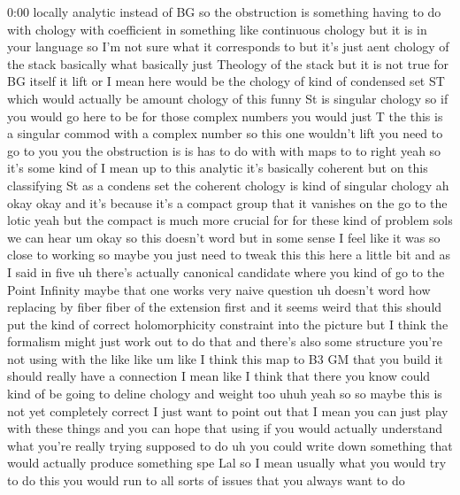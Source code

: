 \begin{unfinished}{0:00}
locally  analytic  instead  of  BG  so  the
obstruction  is  something  having  to  do
with  chology  with  coefficient  in
something  like  continuous  chology  but  it
is  in  your  language  so  I'm  not  sure  what
it  corresponds  to  but  it's  just  aent
chology  of  the  stack  basically  what
basically  just  Theology  of  the
stack  but  it  is  not  true  for  BG  itself
it  lift  or  I  mean  here  would  be  the
chology  of  kind  of  condensed  set  ST
which  would  actually  be  amount  chology
of  this  funny  St  is  singular
chology  so  if  you  would  go  here  to  be
for  those  complex  numbers  you  would  just
T  the  this  is  a  singular  commod  with  a
complex  number  so  this  one  wouldn't  lift
you  need  to  go
to  you  you  the  obstruction  is  is  has  to
do  with  with  maps
to
to  right  yeah  so  it's  some  kind  of  I
mean  up  to  this  analytic  it's  basically
coherent  but  on  this  classifying  St  as  a
condens  set  the  coherent  chology  is  kind
of  singular  chology  ah  okay  okay
and  it's  because  it's  a  compact  group
that  it  vanishes  on
the  go  to  the  lotic  yeah  but  the  compact
is  much  more  crucial  for  for  these  kind
of  problem  sols  we  can  hear
um  okay  so  this  doesn't  word  but  in  some
sense  I  feel  like  it  was  so  close  to
working  so  maybe  you  just  need  to  tweak
this  this  here  a  little  bit  and  as  I
said  in  five  uh  there's  actually
canonical  candidate  where  you  kind  of  go
to  the  Point  Infinity  maybe  that  one
works  very  naive
question
uh  doesn't
word  how
replacing
by
fiber  fiber  of  the
extension  first
and  it  seems  weird  that  this  should  put
the  kind  of  correct  holomorphicity
constraint  into  the  picture  but  I  think
the  formalism  might  just  work  out  to  do
that  and  there's  also  some  structure
you're  not  using  with  the  like
like
um  like  I  think  this  map  to  B3  GM  that
you
build  it  should  really  have  a  connection
I  mean  like  I  think  that  there  you  know
could  kind  of  be  going  to  deline  chology
and  weight  too
uhuh  yeah  so  so  maybe  this  is  not  yet
completely  correct  I  just  want  to  point
out  that  I  mean  you  can  just  play  with
these  things  and  you  can  hope  that  using
if  you  would  actually  understand  what
you're  really  trying  supposed  to  do  uh
you  could  write  down  something  that
would  actually  produce  something  spe
Lal  so  I  mean  usually  what  you  would  try
to  do  this  you  would  run  to  all  sorts  of
issues  that  you  always  want  to  do

\end{unfinished}
